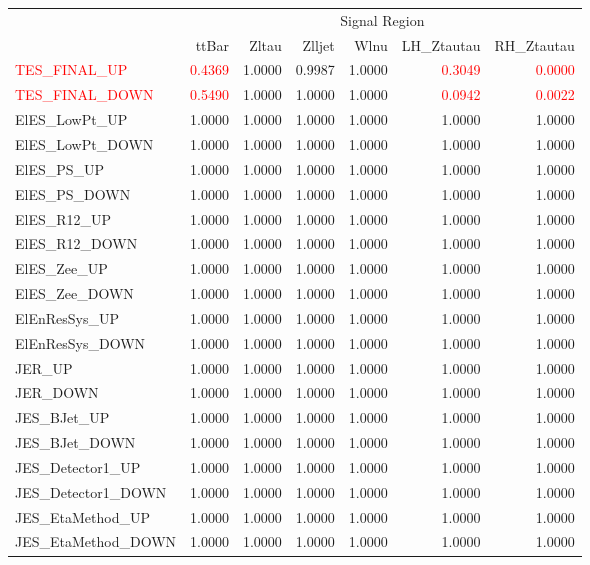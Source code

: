 \documentclass[11pt,oneside,a4paper]{article}
\begin{document}
\centering
\begin{table}
\centering
\begin{tabular}{lrrrrrr}
 & \multicolumn{6}{c}{Signal Region} \\
 & ttBar & Zltau & Zlljet & Wlnu & LH\_Ztautau & RH\_Ztautau \\
\textcolor{red}{TES\_FINAL\_UP} & \textcolor{red}{0.4369} & 1.0000 & 0.9987 & 1.0000 & \textcolor{red}{0.3049} & \textcolor{red}{0.0000} \\
\textcolor{red}{TES\_FINAL\_DOWN} & \textcolor{red}{0.5490} & 1.0000 & 1.0000 & 1.0000 & \textcolor{red}{0.0942} & \textcolor{red}{0.0022} \\
ElES\_LowPt\_UP & 1.0000 & 1.0000 & 1.0000 & 1.0000 & 1.0000 & 1.0000 \\
ElES\_LowPt\_DOWN & 1.0000 & 1.0000 & 1.0000 & 1.0000 & 1.0000 & 1.0000 \\
ElES\_PS\_UP & 1.0000 & 1.0000 & 1.0000 & 1.0000 & 1.0000 & 1.0000 \\
ElES\_PS\_DOWN & 1.0000 & 1.0000 & 1.0000 & 1.0000 & 1.0000 & 1.0000 \\
ElES\_R12\_UP & 1.0000 & 1.0000 & 1.0000 & 1.0000 & 1.0000 & 1.0000 \\
ElES\_R12\_DOWN & 1.0000 & 1.0000 & 1.0000 & 1.0000 & 1.0000 & 1.0000 \\
ElES\_Zee\_UP & 1.0000 & 1.0000 & 1.0000 & 1.0000 & 1.0000 & 1.0000 \\
ElES\_Zee\_DOWN & 1.0000 & 1.0000 & 1.0000 & 1.0000 & 1.0000 & 1.0000 \\
ElEnResSys\_UP & 1.0000 & 1.0000 & 1.0000 & 1.0000 & 1.0000 & 1.0000 \\
ElEnResSys\_DOWN & 1.0000 & 1.0000 & 1.0000 & 1.0000 & 1.0000 & 1.0000 \\
JER\_UP & 1.0000 & 1.0000 & 1.0000 & 1.0000 & 1.0000 & 1.0000 \\
JER\_DOWN & 1.0000 & 1.0000 & 1.0000 & 1.0000 & 1.0000 & 1.0000 \\
JES\_BJet\_UP & 1.0000 & 1.0000 & 1.0000 & 1.0000 & 1.0000 & 1.0000 \\
JES\_BJet\_DOWN & 1.0000 & 1.0000 & 1.0000 & 1.0000 & 1.0000 & 1.0000 \\
JES\_Detector1\_UP & 1.0000 & 1.0000 & 1.0000 & 1.0000 & 1.0000 & 1.0000 \\
JES\_Detector1\_DOWN & 1.0000 & 1.0000 & 1.0000 & 1.0000 & 1.0000 & 1.0000 \\
JES\_EtaMethod\_UP & 1.0000 & 1.0000 & 1.0000 & 1.0000 & 1.0000 & 1.0000 \\
JES\_EtaMethod\_DOWN & 1.0000 & 1.0000 & 1.0000 & 1.0000 & 1.0000 & 1.0000 \\

\end{tabular}
\end{table}
\end{document}
